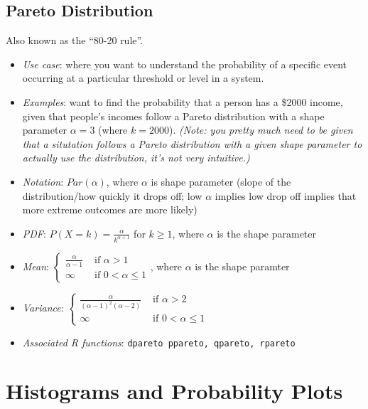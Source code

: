 \documentclass[12pt]{article}
\begin{document}
\subsection*{Pareto Distribution}

Also known as the ``80-20 rule''.

\begin{itemize}
	\item \textit{Use case}: where you want to understand the probability of a
	      specific event occurring at a particular threshold or level in a system.
	\item \textit{Examples}: want to find the probability that a person has
	      a \$2000 income, given that people's incomes follow a Pareto distribution
	      with a shape parameter $\alpha = 3$ (where $k = 2000$). \emph{(Note:
		      you pretty much need to be given that a situtation follows a Pareto
		      distribution with a given shape parameter to actually use the
		      distribution, it's not very intuitive.)}
	\item \textit{Notation}: $Par(\alpha)$, where $\alpha$ is shape
	      parameter (slope of the distribution/how quickly it drops off; low
	      $\alpha$ implies low drop off implies that more extreme outcomes are
	      more likely)
	\item \textit{PDF}: $P(X = k) = \frac{\alpha}{k^{\alpha + 1}}$ for $k
		      \geq 1$, where $\alpha$ is the shape parameter
	\item \textit{Mean}: $\begin{cases}
			      \frac{\alpha}{\alpha - 1} & \text{ if } \alpha > 1        \\
			      \infty                    & \text{ if } 0 < \alpha \leq 1
		      \end{cases}$, where $\alpha$ is the shape paramter
	\item \textit{Variance}: $\begin{cases}
			      \frac{\alpha}{(\alpha-1)^2(\alpha-2)} & \text{ if } \alpha > 2        \\
			      \infty                                & \text{ if } 0 < \alpha \leq 1
		      \end{cases}$
	\item \textit{Associated R functions}: \verb|dpareto ppareto, qpareto, rpareto|
\end{itemize}

\section{Histograms and Probability Plots}
\end{document}
